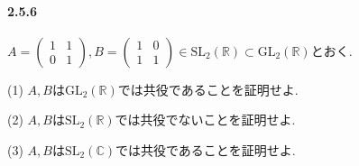 \paragraph{2.5.6}
$A=\begin{pmatrix}1&1\\0&1\end{pmatrix},B=\begin{pmatrix}1&0\\1&1\end{pmatrix}
\in \mathrm{SL}_2(\mathbb{R}) \subset \mathrm{GL}_2(\mathbb{R})$とおく.

(1) $A,B$は$\mathrm{GL}_2(\mathbb{R})$では共役であることを証明せよ.

(2) $A,B$は$\mathrm{SL}_2(\mathbb{R})$では共役でないことを証明せよ.

(3) $A,B$は$\mathrm{SL}_2(\mathbb{C})$では共役であることを証明せよ.


